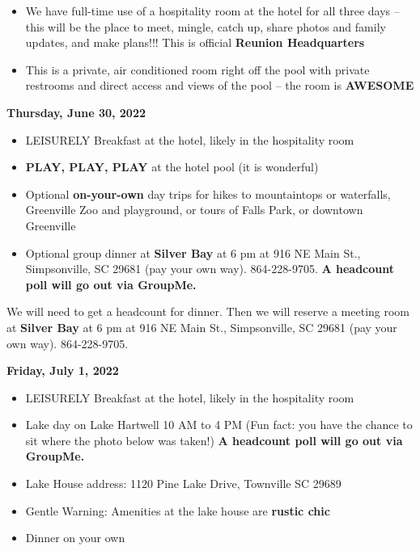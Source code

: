 \documentclass[
]{book}
\providecommand{\tightlist}{%
  \setlength{\itemsep}{0pt}\setlength{\parskip}{0pt}}
\begin{document}
\begin{itemize}
\tightlist
\item
  We have full-time use of a hospitality room at the hotel for all three days -- this will be the place to meet, mingle, catch up, share photos and family updates, and make plans!!! This is official \textbf{Reunion Headquarters}
\item
  This is a private, air conditioned room right off the pool with private restrooms and direct access and views of the pool -- the room is \textbf{AWESOME}
\end{itemize}

\textbf{Thursday, June 30, 2022}

\begin{itemize}
\tightlist
\item
  LEISURELY Breakfast at the hotel, likely in the hospitality room
\item
  \textbf{PLAY, PLAY, PLAY} at the hotel pool (it is wonderful)
\item
  Optional \textbf{on-your-own} day trips for hikes to mountaintops or waterfalls, Greenville Zoo and playground, or tours of Falls Park, or downtown Greenville
\item
  Optional group dinner at \textbf{Silver Bay} at 6 pm at 916 NE Main St., Simpsonville, SC 29681 (pay your own way). 864-228-9705. \textbf{A headcount poll will go out via GroupMe.}
\end{itemize}

We will need to get a headcount for dinner. Then we will reserve a meeting room at \textbf{Silver Bay} at 6 pm at 916 NE Main St., Simpsonville, SC 29681 (pay your own way). 864-228-9705.

\textbf{Friday, July 1, 2022}

\begin{itemize}
\tightlist
\item
  LEISURELY Breakfast at the hotel, likely in the hospitality room
\item
  Lake day on Lake Hartwell 10 AM to 4 PM (Fun fact: you have the chance to sit where the photo below was taken!) \textbf{A headcount poll will go out via GroupMe.}
\item
  Lake House address: 1120 Pine Lake Drive, Townville SC 29689
\item
  Gentle Warning: Amenities at the lake house are \textbf{rustic chic}
\item
  Dinner on your own
\end{itemize}
\end{document}
